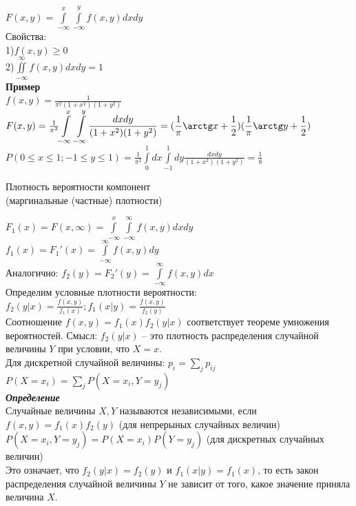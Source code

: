 \documentclass[russian, 12pt, fleqn]{article}
\begin{document}
$F(x, y) = \displaystyle{\int\limits_{-\infty}^{x} \int\limits_{-\infty}^{y} f(x, y) dx dy}$\\
Свойства:\\
1)$f(x, y) \geq 0$\\
2)$\iint\limits_{-\infty}^{\infty} f(x, y) dxdy = 1$\\
\textbf{Пример} \\
$f(x, y) = \frac{1}{\pi^2(1+x^2)(1+y^2)}$\\
$F(x, y) = \frac{1}{\pi^2} \displaystyle{\int\limits_{-\infty}^{x}  \int\limits_{-\infty}^{y}} \frac{dxdy}{(1+x^2)(1+y^2)} = (\frac{1}{\pi}\arctg x + \frac{1}{2}) (\frac{1}{\pi}\arctg y + \frac{1}{2})$\\
$P(0\leq x \leq 1; -1 \leq y \leq 1) = \frac{1}{\pi^2} \displaystyle{\int\limits_{0}^{1}dx\int\limits_{-1}^{1} dy \frac{dxdy}{(1+x^2)(1+y^2)}} = \frac{1}{8}$
\begin{center}
$\textbf{Плотность вероятности компонент}$\\
(маргинальные (частные) плотности)
\end{center}
$F_1(x) = F(x, \infty)  = \displaystyle{\int\limits_{-\infty}^{x}\int\limits_{-\infty}^{\infty}f(x, y)dxdy}$\\
$f_1(x) = F_1'(x) = \displaystyle{\int \limits_{-\infty}^{\infty}} f(x, y) dy$\\
Аналогично: $f_2(y) = F_2'(y) = \displaystyle{\int \limits_{-\infty}^{\infty}} f(x, y) dx$\\
Определим условные плотности вероятности: $f_2(y|x) = \frac{f(x,y)}{f_1(x)};f_1(x|y) = \frac{f(x,y)}{f_2(y)}$\\
Соотношение $f(x, y) = f_1(x) f_2(y|x)$ соответствует теореме умножения вероятностей. Смысл: $f_2(y|x)$ -- это плотность распределения случайной величины $Y$ при условии, что $X=x$.\\
Для дискретной случайной величины: $p_i = \sum\limits_{j} p_{ij}$\\
$P(X=x_i) =  \sum\limits_{j} P(X=x_i, Y=y_j)$\\
\textit{\textbf{Определение}}\\
Случайные величины $X, Y$ называются независимыми, если $f(x, y) = f_1(x)f_2(y)$ (для непрерыных случайных величин)\\
$ P(X = x_i, Y = y_j) = P(X=x_i) P(Y=y_j)$ (для дискретных случайных  величин)\\
Это означает, что $f_2(y|x) = f_2(y)$ и $f_1(x|y) = f_1(x)$, то есть закон распределения случайной величины $Y$ не зависит от того, какое значение приняла величина $X$.\\
\end{document}
